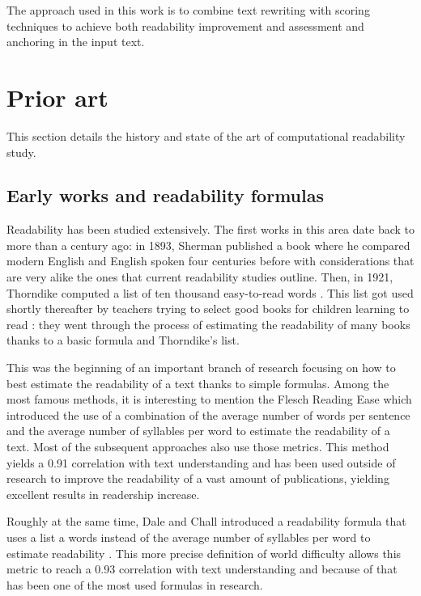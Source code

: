 \documentclass[a4paper, 11pt, onepage]{scrreprt}
\begin{document}
The approach used in this work is to combine text rewriting with
scoring techniques to achieve both readability improvement and
assessment and anchoring in the input text.

\chapter{Prior art}
\label{sec:sota}

This section details the history and state of the art of computational
readability study.

\section{Early works and readability formulas}
\label{sec:early-works-and-formulas}
Readability has been studied extensively. The first works in this area
date back to more than a century ago: in 1893, Sherman published a
book \cite{sherman1893analytics} where he compared modern English and
English spoken four centuries before with considerations that are very
alike the ones that current readability studies outline. Then, in
1921, Thorndike computed a list of ten thousand easy-to-read words
\cite{thorndike1921teacher}. This list got used shortly thereafter by
teachers trying to select good books for children learning to read
\cite{lively1923method}: they went through the process of estimating
the readability of many books thanks to a basic formula and
Thorndike's list.

This was the beginning of an important branch of research focusing on
how to best estimate the readability of a text thanks to simple
formulas. Among the most famous methods, it is interesting to mention
the Flesch Reading Ease \cite{flesch1948new} which introduced the use
of a combination of the average number of words per sentence and the
average number of syllables per word to estimate the readability of a
text. Most of the subsequent approaches also use those metrics. This
method yields a 0.91 correlation with text understanding and has been
used outside of research to improve the readability of a vast amount
of publications, yielding excellent results in readership increase.

Roughly at the same time, Dale and Chall introduced a readability
formula that uses a list a words instead of the average number of
syllables per word to estimate readability
\cite{dale1948formula}. This more precise definition of world
difficulty allows this metric to reach a 0.93 correlation with text
understanding and because of that has been one of the most used
formulas in research.
\end{document}
